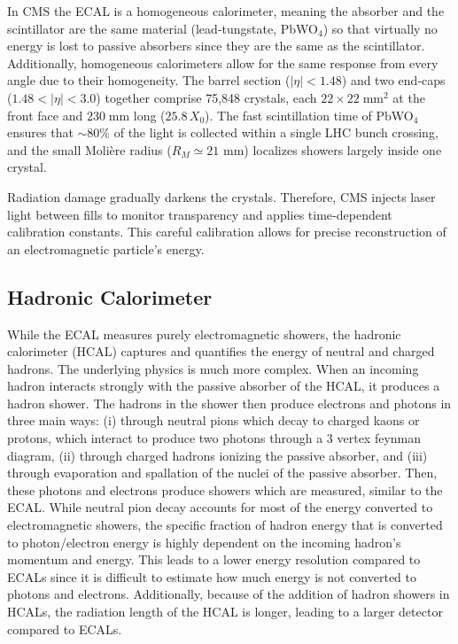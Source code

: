 In CMS the ECAL is a homogeneous calorimeter, meaning the absorber and the scintillator are the same material (lead‑tungstate, PbWO$_4$) so that virtually no energy is lost to passive absorbers since they are the same as the scintillator. Additionally, homogeneous calorimeters allow for the same response from every angle due to their homogeneity. The barrel section ($|\eta|<1.48$) and two end‑caps ($1.48<|\eta|<3.0$) together comprise 75,848 crystals, each $22\times22\;\text{mm}^2$ at the front face and $230\;\text{mm}$ long ($25.8\,X_{0}$). The fast scintillation time of PbWO$_4$ ensures that $\sim80\%$ of the light is collected within a single LHC bunch crossing, and the small Molière radius ($R_M\simeq21$ mm) localizes showers largely inside one crystal.  

Radiation damage gradually darkens the crystals. Therefore, CMS injects laser light between fills to monitor transparency and applies time‑dependent calibration constants. This careful calibration allows for precise reconstruction of an electromagnetic particle's energy. 


\subsection{Hadronic Calorimeter}
While the ECAL measures purely electromagnetic showers, the hadronic calorimeter (HCAL) captures and quantifies the energy of neutral and charged hadrons.  The underlying physics is much more complex. When an incoming hadron interacts strongly with the passive absorber of the HCAL, it produces a hadron shower. The hadrons in the shower then produce electrons and photons in three main ways: (i) through neutral pions which decay to charged kaons or protons, which interact to produce two photons through a 3 vertex feynman diagram, (ii) through charged hadrons ionizing the passive absorber, and (iii) through evaporation and spallation of the nuclei of the passive absorber. Then, these photons and electrons produce showers which are measured, similar to the ECAL. While neutral pion decay accounts for most of the energy converted to electromagnetic showers, the specific fraction of hadron energy that is converted to photon/electron energy is highly dependent on the incoming hadron’s momentum and energy. This leads to a lower energy resolution compared to ECALs since it is difficult to estimate how much energy is not converted to photons and electrons. Additionally, because of the addition of hadron showers in HCALs, the radiation length of the HCAL is longer, leading to a larger detector compared to ECALs. 


